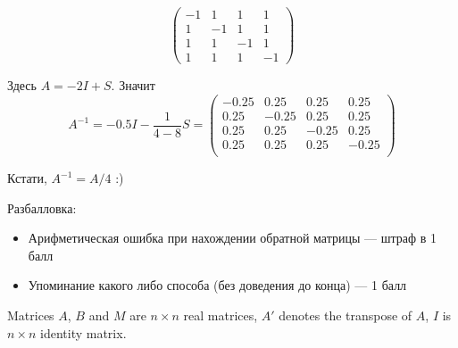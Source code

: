 \documentclass[addpoints, answers]{exam} %
\begin{document}
\begin{questions}
\begin{parts}
\[
\begin{pmatrix}
-1 & 1 & 1 & 1 \\
1 & -1 & 1 & 1 \\
1 & 1 & -1 & 1 \\
1 & 1 & 1 & -1
\end{pmatrix}
\]

\begin{solution}
Здесь $A=-2I+S$. Значит
\[
A^{-1}=-0.5I - \frac{1}{4-8}S =
\begin{pmatrix}
-0.25 & 0.25 & 0.25 & 0.25 \\
0.25 & -0.25 & 0.25 & 0.25 \\
0.25 & 0.25 & -0.25 & 0.25 \\
0.25 & 0.25 & 0.25 & -0.25 \\
\end{pmatrix}
\]

Кстати, $A^{-1}=A/4$ :)

Разбалловка:
\begin{itemize}
\item Арифметическая ошибка при нахождении обратной матрицы --- штраф в 1 балл
\item Упоминание какого либо способа (без доведения до конца) --- 1 балл
\end{itemize}


\end{solution}



\end{parts}


\question Matrices $A$, $B$ and $M$ are $n\times n$ real matrices, $A'$ denotes the transpose of $A$, $I$ is $n\times n$ identity matrix.
\end{questions}
\end{document}
